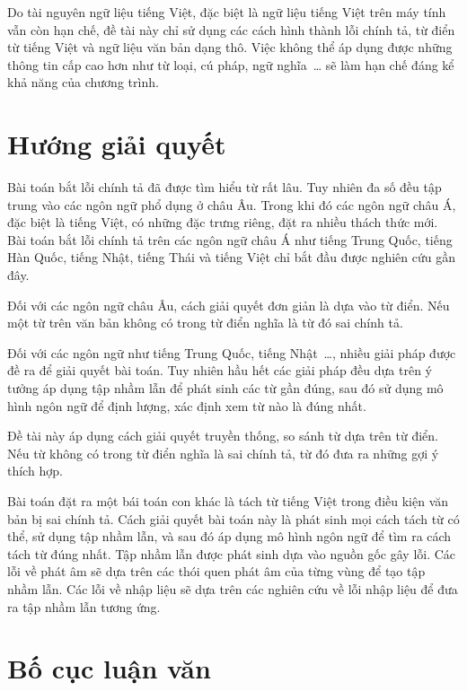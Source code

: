 \documentclass[a4paper,oneside,14pt]{extbook} %
\begin{document}
Do tài nguyên ngữ liệu tiếng Việt, đặc biệt là ngữ liệu tiếng Việt
trên máy tính vẫn còn hạn chế, đề tài này chỉ sử dụng các cách hình
thành lỗi chính tả, từ điển từ tiếng Việt và ngữ liệu văn bản dạng
thô. Việc không thể áp dụng được những thông tin cấp cao hơn như từ
loại, cú pháp, ngữ nghĩa~\ldots{} sẽ làm hạn chế đáng kể khả năng của
chương trình.


\section{Hướng giải quyết}


Bài toán bắt lỗi chính tả đã được tìm hiểu từ rất lâu. Tuy nhiên đa số
đều tập trung vào các ngôn ngữ phổ dụng ở châu Âu. Trong khi đó các ngôn
ngữ châu Á, đặc biệt là tiếng Việt, có những đặc trưng riêng, đặt ra
nhiều thách thức mới. Bài toán bắt lỗi chính tả trên các ngôn ngữ châu
Á như tiếng Trung Quốc, tiếng Hàn Quốc, tiếng Nhật, tiếng Thái và tiếng Việt
chỉ bắt đầu được nghiên cứu gần đây.

Đối với các ngôn ngữ châu Âu, cách giải quyết đơn giản là dựa vào từ
điển. Nếu một từ trên văn bản không có trong từ điển nghĩa là từ đó
sai chính tả.

Đối với các ngôn ngữ như tiếng Trung Quốc, tiếng Nhật~\ldots{}, nhiều
giải pháp được đề ra để giải quyết bài toán. Tuy nhiên hầu hết các
giải pháp đều dựa trên ý tưởng áp dụng tập nhầm lẫn để phát sinh các
từ gần đúng, sau đó sử dụng mô hình ngôn ngữ để định lượng, xác định
xem từ nào là đúng nhất.


Đề tài này áp dụng cách giải quyết truyền thống, so sánh từ dựa trên
từ điển. Nếu từ không có trong từ điển nghĩa là sai chính tả, từ đó
đưa ra những gợi ý thích hợp.

Bài toán đặt ra một bái toán con khác là tách từ tiếng Việt trong điều
kiện văn bản bị sai chính tả. Cách giải quyết bài toán này là phát sinh
mọi cách tách từ có thể, sử dụng tập nhầm lẫn, và sau đó áp dụng mô hình
ngôn ngữ để tìm ra cách tách từ đúng nhất. Tập nhầm lẫn được phát sinh
dựa vào nguồn gốc gây lỗi. Các lỗi về phát âm sẽ dựa trên các thói
quen phát âm của từng vùng để tạo tập nhầm lẫn. Các lỗi về nhập liệu
sẽ dựa trên các nghiên cứu về lỗi nhập liệu để đưa ra tập nhầm lẫn
tương ứng.


\section{Bố cục luận văn}
\end{document}
